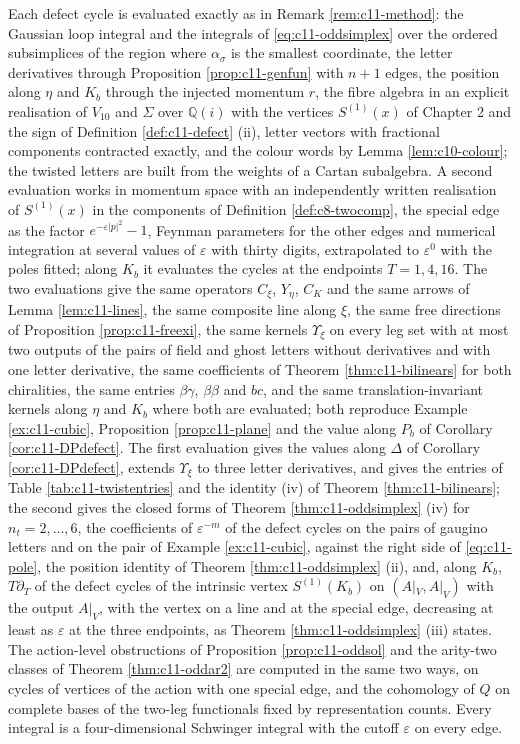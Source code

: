 \begin{remark}
\label{rem:c11-oddmethod}
Each defect cycle is evaluated exactly as in Remark \ref{rem:c11-method}: the Gaussian loop integral and the integrals of \eqref{eq:c11-oddsimplex} over the ordered subsimplices of the region where $\alpha_\sigma$ is the smallest coordinate, the letter derivatives through Proposition \ref{prop:c11-genfun} with $n+1$ edges, the position along $\eta$ and $K_b$ through the injected momentum $r$, the fibre algebra in an explicit realisation of $V_{10}$ and $\Sigma$ over $\mathbb Q(i)$ with the vertices $S^{(1)}(x)$ of Chapter 2 and the sign of Definition \ref{def:c11-defect} (ii), letter vectors with fractional components contracted exactly, and the colour words by Lemma \ref{lem:c10-colour}; the twisted letters are built from the weights of a Cartan subalgebra. A second evaluation works in momentum space with an independently written realisation of $S^{(1)}(x)$ in the components of Definition \ref{def:c8-twocomp}, the special edge as the factor $e^{-\varepsilon|p|^2}-1$, Feynman parameters for the other edges and numerical integration at several values of $\varepsilon$ with thirty digits, extrapolated to $\varepsilon^0$ with the poles fitted; along $K_b$ it evaluates the cycles at the endpoints $T=1,4,16$. The two evaluations give the same operators $C_\xi$, $Y_\eta$, $C_K$ and the same arrows of Lemma \ref{lem:c11-lines}, the same composite line along $\xi$, the same free directions of Proposition \ref{prop:c11-freexi}, the same kernels $\Upsilon_\xi$ on every leg set with at most two outputs of the pairs of field and ghost letters without derivatives and with one letter derivative, the same coefficients of Theorem \ref{thm:c11-bilinears} for both chiralities, the same entries $\beta\gamma$, $\beta\beta$ and $bc$, and the same translation-invariant kernels along $\eta$ and $K_b$ where both are evaluated; both reproduce Example \ref{ex:c11-cubic}, Proposition \ref{prop:c11-plane} and the value along $P_b$ of Corollary \ref{cor:c11-DPdefect}. The first evaluation gives the values along $\Delta$ of Corollary \ref{cor:c11-DPdefect}, extends $\Upsilon_\xi$ to three letter derivatives, and gives the entries of Table \ref{tab:c11-twistentries} and the identity (iv) of Theorem \ref{thm:c11-bilinears}; the second gives the closed forms of Theorem \ref{thm:c11-oddsimplex} (iv) for $n_t=2,\dots,6$, the coefficients of $\varepsilon^{-m}$ of the defect cycles on the pairs of gaugino letters and on the pair of Example \ref{ex:c11-cubic}, against the right side of \eqref{eq:c11-pole}, the position identity of Theorem \ref{thm:c11-oddsimplex} (ii), and, along $K_b$, $T\partial_T$ of the defect cycles of the intrinsic vertex $S^{(1)}(K_b)$ on $(A|_V,A|_V)$ with the output $A|_V$, with the vertex on a line and at the special edge, decreasing at least as $\varepsilon$ at the three endpoints, as Theorem \ref{thm:c11-oddsimplex} (iii) states. The action-level obstructions of Proposition \ref{prop:c11-oddsol} and the arity-two classes of Theorem \ref{thm:c11-oddar2} are computed in the same two ways, on cycles of vertices of the action with one special edge, and the cohomology of $Q$ on complete bases of the two-leg functionals fixed by representation counts. Every integral is a four-dimensional Schwinger integral with the cutoff $\varepsilon$ on every edge.
\end{remark}
